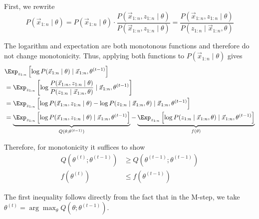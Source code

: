 First, we rewrite
\begin{equation*}
    P(\vec{x}_{1:n} \mid \theta)
    = P(\vec{x}_{1:n} \mid \theta) \cdot \frac{P(\vec{x}_{1:n}, z_{1:n} \mid \theta)}{P(\vec{x}_{1:n}, z_{1:n} \mid \theta)}
    = \frac{P(\vec{x}_{1:n}, z_{1:n} \mid \theta)}{P(z_{1:n} \mid \vec{x}_{1:n}, \theta)}
\end{equation*}

The logarithm and expectation are both
monotonous functions and therefore
do not change monotonicity.
Thus, applying both functions to
$P(\vec{x}_{1:n} \mid \theta)$ gives
\begin{align*}
    & \Exp_{z_{1:n}}\left[
        \log{P(\vec{x}_{1:n} \mid \theta)}
        \mid \vec{x}_{1:n}, \theta^{(t-1)}
    \right] \\
    &= \Exp_{z_{1:n}}\left[
        \log{\frac{P(\vec{x}_{1:n}, z_{1:n} \mid \theta)}{P(z_{1:n} \mid \vec{x}_{1:n}, \theta)}}
        \mid \vec{x}_{1:n}, \theta^{(t-1)}
    \right] \\
    &= \Exp_{z_{1:n}}\left[
        \log{P(\vec{x}_{1:n}, z_{1:n} \mid \theta)} - \log{P(z_{1:n} \mid \vec{x}_{1:n}, \theta)}
        \mid \vec{x}_{1:n}, \theta^{(t-1)}
    \right] \\
    &= \underbrace{
    \Exp_{z_{1:n}}\left[
        \log{P(\vec{x}_{1:n}, z_{1:n} \mid \theta)}
        \mid \vec{x}_{1:n}, \theta^{(t-1)}
    \right]
    }_{Q(\theta; \theta^{(t-1)})}
    -
    \underbrace{
    \Exp_{z_{1:n}}\left[
        \log{P(z_{1:n} \mid \vec{x}_{1:n}, \theta)}
        \mid \vec{x}_{1:n}, \theta^{(t-1)}
    \right]
    }_{f(\theta)}
\end{align*}

Therefore, for monotonicity
it suffices to show
\begin{align*}
    Q(\theta^{(t)}; \theta^{(t-1)}) &\geq Q(\theta^{(t - 1)}; \theta^{(t-1)}) \\
    f(\theta^{(t)}) &\leq f(\theta^{(t-1)})
\end{align*}

The first inequality follows directly from
the fact that in the M-step,
we take $\theta^{(t)} = \arg\max_\theta{Q(\theta; \theta^{(t-1)})}$.

